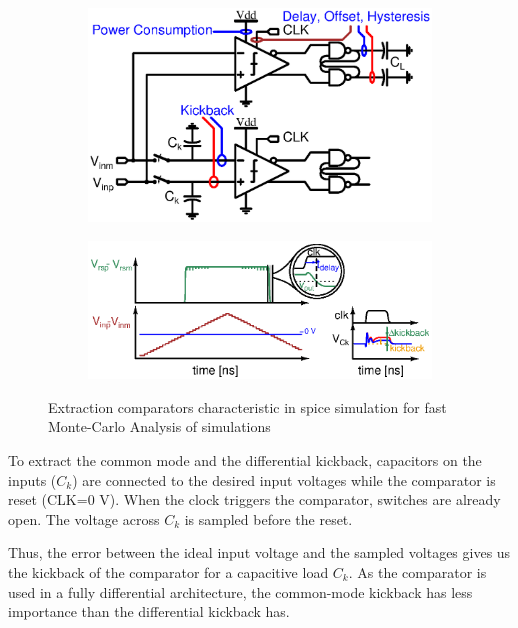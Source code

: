 \begin{figure}[htp]
    \centering
    \begin{subfigure}[b]{0.40\textwidth}
        \centering
        \includegraphics[width=\textwidth]{Chapter7/Figs/cmp_tb.ps}
        \label{fig:cmp_tb}
    \end{subfigure}
    \begin{subfigure}[b]{0.58\textwidth}
        \centering
        \includegraphics[width=\textwidth]{Chapter7/Figs/cmp_tb_signals.ps}
        \label{fig:test_signals}
    \end{subfigure}
    \caption{Extraction comparators characteristic in spice simulation for fast Monte-Carlo Analysis of simulations}
    \label{fig:cmp_testbench}
\end{figure}

To extract the common mode and the differential kickback, capacitors on the inputs (\(C_{k}\)) are connected to the desired input voltages while the comparator is reset (CLK=0 V). When the clock triggers the comparator, switches are already open. The voltage across \(C_{k}\) is sampled before the reset.

Thus, the error between the ideal input voltage and the sampled voltages gives us the kickback of the comparator for a capacitive load \(C_{k}\). As the comparator is used in a fully differential architecture, the common-mode kickback has less importance than the differential kickback has.


